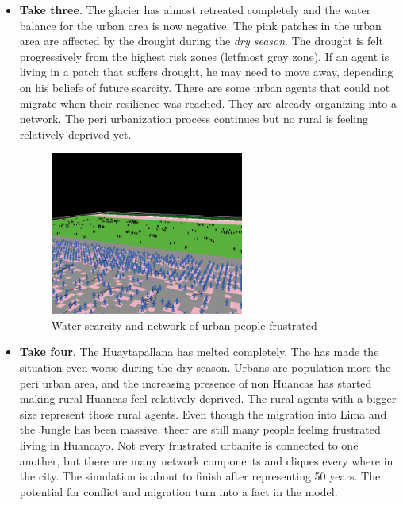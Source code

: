 \documentclass{article}
\begin{document}
\begin{itemize}
\item {\bf Take three}. The glacier has almost retreated completely and the water balance for the urban area is now negative. The pink patches in the urban area are affected by the drought during the \emph{dry season}. The drought is felt progressively from the highest risk zones (letfmost gray zone).  If an agent is living in a patch that suffers drought, he may need to move away, depending on his beliefs of future scarcity. There are some urban agents that could not migrate when their resilience was reached. They are already organizing into a network. The peri urbanization process continues but no rural is feeling relatively deprived yet.

\begin{figure}[h]
  \centering
  \includegraphics[width=0.6\textwidth]{esc3}
  \caption{Water scarcity and network of urban people frustrated}
  \label{network}
\end{figure}

\item {\bf Take four}. The Huaytapallana has melted completely. The has made the situation even worse during the dry season. Urbans are population more the peri urban area, and the increasing presence of non Huancas has started making rural Huancas feel relatively deprived. The rural agents with a bigger size represent those rural agents. Even though the migration into Lima and the Jungle has been massive, theer are still many people feeling frustrated living in Huancayo. Not every frustrated urbanite is connected to one another, but there are many network components and cliques every where in the city. The simulation is about to finish after representing 50 years. The potential for conflict and migration turn into a fact in the model.


\end{itemize}
\end{document}
